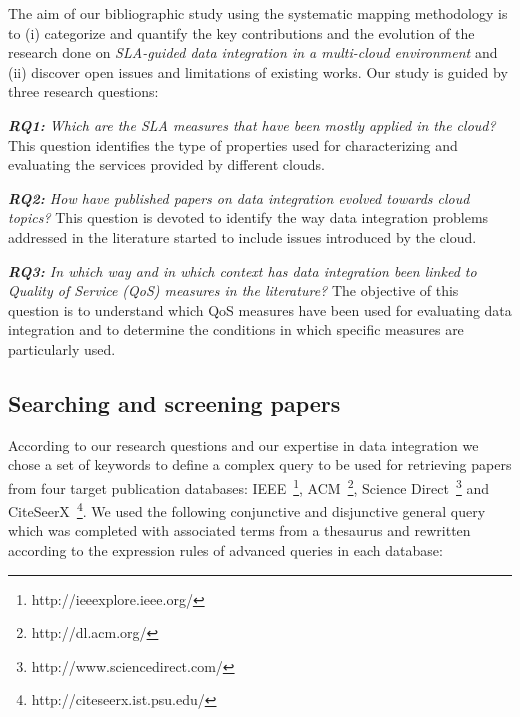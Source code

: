 
The aim of our bibliographic study using the systematic mapping methodology \cite{SM:Petersen:2008} is to (i) categorize and quantify the key contributions and the evolution of the research done on \textit{SLA-guided
data integration in a multi-cloud environment} and  (ii) discover open issues and limitations of existing works.    
Our study is guided by  three research questions:


\textit{\textbf{RQ1:} Which are the SLA measures that have been mostly
applied  in the cloud?} This question  identifies  the type of
properties used for characterizing and evaluating the services provided  by
different clouds.   
 
\textit{\textbf{RQ2:}  How have published papers on data
 integration evolved towards cloud topics?} This question is devoted to identify the way  data integration problems addressed in the literature started  to include issues introduced by the cloud.

\textit{\textbf{RQ3:} In which way and in which  context has data integration  been linked to Quality of Service (QoS) measures in the literature?} The objective of this question is to understand which QoS measures have been used for evaluating data integration and to determine the conditions in which  specific measures are particularly used.

\subsection{Searching and screening  papers} \label{subsec:search}

According to our research questions and our expertise in data integration we chose a set of keywords to define a complex query to be used for retrieving papers from four target publication databases: IEEE~\footnote{http://ieeexplore.ieee.org/},
ACM~\footnote{http://dl.acm.org/}, Science Direct~\footnote{http://www.sciencedirect.com/} and
CiteSeerX~\footnote{http://citeseerx.ist.psu.edu/}. We used the following conjunctive and disjunctive general query which was completed with associated terms from a thesaurus and rewritten according to the expression rules of advanced queries in each database: 





